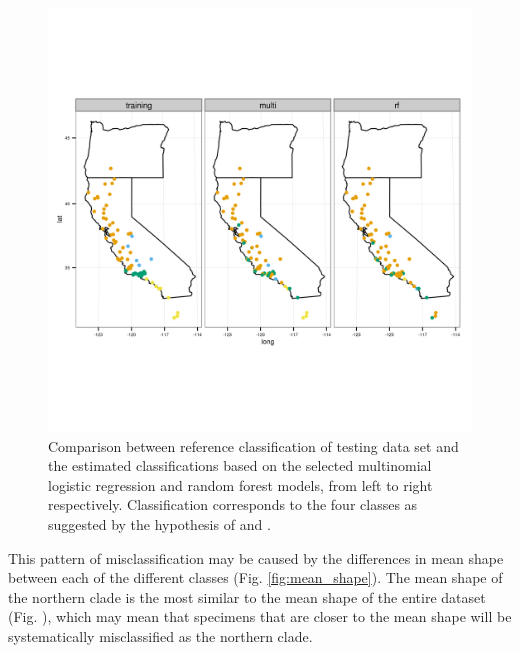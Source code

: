 \documentclass[12pt]{article}\usepackage{graphicx, color}
\begin{document}
\begin{figure}[ht]
  \centering
  \includegraphics[width = \textwidth]{figure/gen_map}
  \caption{Comparison between reference classification of testing data set and the estimated classifications based on the selected multinomial logistic regression and random forest models, from left to right respectively. Classification corresponds to the four classes as suggested by the hypothesis of \citet{Spinks2005} and \citet{Spinks2010}.}
  \label{fig:gen_map}
\end{figure}

This pattern of misclassification may be caused by the differences in mean shape between each of the different classes (Fig. \ref{fig:mean_shape}). The mean shape of the northern clade is the most similar to the mean shape of the entire dataset (Fig. ), which may mean that specimens that are closer to the mean shape will be systematically misclassified as the northern clade.
\end{document}
